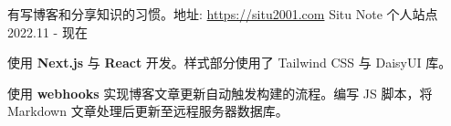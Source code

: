 \begin{cventries}

    \cventry
    {有写博客和分享知识的习惯。地址: \href{https://situ2001.com}{https://situ2001.com}} %
    {Situ Note 个人站点} %
    {} %
    {2022.11 - 现在} %
    {
        \begin{cvitems} %
            \item {使用 \textbf{Next.js} 与 \textbf{React} 开发。样式部分使用了 Tailwind CSS 与 DaisyUI 库。}
            \item {使用 \textbf{webhooks} 实现博客文章更新自动触发构建的流程。编写 JS 脚本，将 Markdown 文章处理后更新至远程服务器数据库。}
        \end{cvitems}
    }

\end{cventries}
